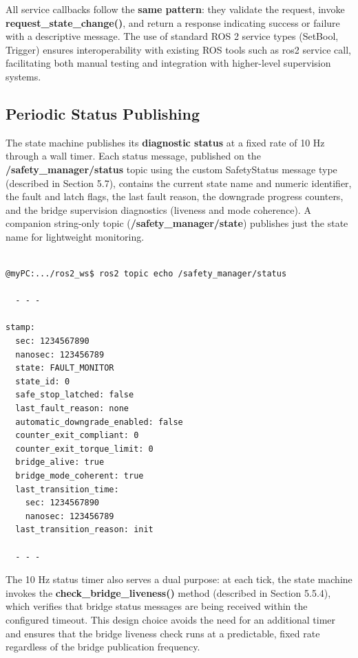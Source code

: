 All service callbacks follow the \textbf{same pattern}: they validate the request, invoke \textbf{request\_state\_change()}, and return a response indicating success or failure with a descriptive message. The use of standard ROS 2 service types (SetBool, Trigger) ensures interoperability with existing ROS tools such as ros2 service call, facilitating both manual testing and integration with higher-level supervision systems.

\subsection{Periodic Status Publishing}
The state machine publishes its \textbf{diagnostic status} at a fixed rate of 10 Hz through a wall timer. Each status message, published on the \textbf{/safety\_manager/status} topic using the custom SafetyStatus message type (described in Section 5.7), contains the current state name and numeric identifier, the fault and latch flags, the last fault reason, the downgrade progress counters, and the bridge supervision diagnostics (liveness and mode coherence). A companion string-only topic (\textbf{/safety\_manager/state}) publishes just the state name for lightweight monitoring.

\begin{verbatim}

@myPC:.../ros2_ws$ ros2 topic echo /safety_manager/status

  - - -

stamp:
  sec: 1234567890
  nanosec: 123456789
  state: FAULT_MONITOR
  state_id: 0
  safe_stop_latched: false
  last_fault_reason: none
  automatic_downgrade_enabled: false
  counter_exit_compliant: 0
  counter_exit_torque_limit: 0
  bridge_alive: true
  bridge_mode_coherent: true
  last_transition_time:
    sec: 1234567890
    nanosec: 123456789
  last_transition_reason: init

  - - -

\end{verbatim}


The 10 Hz status timer also serves a dual purpose: at each tick, the state machine invokes the \textbf{check\_bridge\_liveness()} method (described in Section 5.5.4), which verifies that bridge status messages are being received within the configured timeout. This design choice avoids the need for an additional timer and ensures that the bridge liveness check runs at a predictable, fixed rate regardless of the bridge publication frequency.



